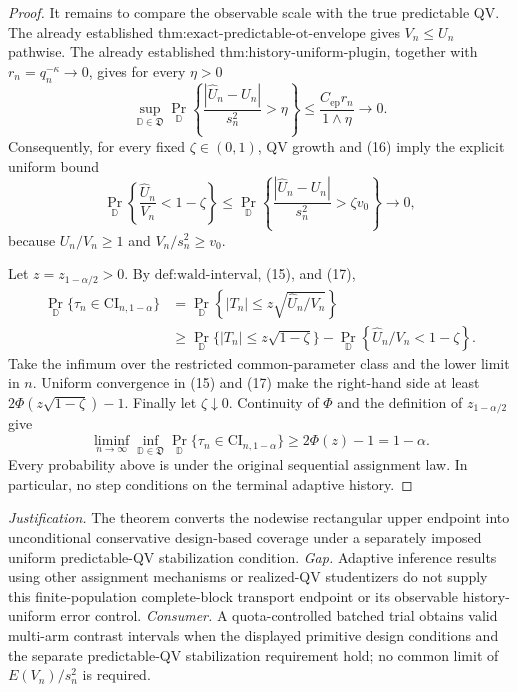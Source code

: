 \documentclass{article}
\begin{document}
\begin{proof}
It remains to compare the observable scale with the true predictable QV.  The already established \(\text{thm:exact-predictable-ot-envelope}\) gives \(V_n\le U_n\) pathwise.  The already established \(\text{thm:history-uniform-plugin}\), together with \(r_n=q_n^{-\kappa}\to0\), gives for every \(\eta>0\)
\[
\sup_{\mathbb D\in\mathfrak D}
\Pr_{\mathbb D}\!\left\{\frac{|\widehat U_n-U_n|}{s_n^2}>\eta\right\}
\le\frac{C_{\mathrm{ep}}r_n}{1\wedge\eta}\longrightarrow0.
\tag{16}
\]
Consequently, for every fixed \(\zeta\in(0,1)\), QV growth and (16) imply the explicit uniform bound
\[
\Pr_{\mathbb D}\!\left\{\frac{\widehat U_n}{V_n}<1-\zeta\right\}
\le
\Pr_{\mathbb D}\!\left\{\frac{|\widehat U_n-U_n|}{s_n^2}>\zeta v_0\right\}
\longrightarrow0,
\tag{17}
\]
because \(U_n/V_n\ge1\) and \(V_n/s_n^2\ge v_0\).

Let \(z=z_{1-\alpha/2}>0\).  By \(\text{def:wald-interval}\), (15), and (17),
\[
\begin{aligned}
\Pr_{\mathbb D}\{\tau_n\in\mathrm{CI}_{n,1-\alpha}\}
&=\Pr_{\mathbb D}\!\left\{|T_n|\le z\sqrt{\widehat U_n/V_n}\right\}\\
&\ge \Pr_{\mathbb D}\{|T_n|\le z\sqrt{1-\zeta}\}
-\Pr_{\mathbb D}\!\left\{\widehat U_n/V_n<1-\zeta\right\}.
\end{aligned}
\tag{18}
\]
Take the infimum over the restricted common-parameter class and the lower limit in \(n\).  Uniform convergence in (15) and (17) make the right-hand side at least
\(2\Phi(z\sqrt{1-\zeta})-1\).  Finally let \(\zeta\downarrow0\).  Continuity of \(\Phi\) and the definition of \(z_{1-\alpha/2}\) give
\[
\liminf_{n\to\infty}\inf_{\mathbb D\in\mathfrak D}
\Pr_{\mathbb D}\{\tau_n\in\mathrm{CI}_{n,1-\alpha}\}
\ge2\Phi(z)-1=1-\alpha.
\tag{19}
\]
Every probability above is under the original sequential assignment law.  In particular, no step conditions on the terminal adaptive history.
\end{proof}
\par\smallskip\noindent \textit{Justification.} The theorem converts the nodewise rectangular upper endpoint into unconditional conservative design-based coverage under a separately imposed uniform predictable-QV stabilization condition. \textit{Gap.} Adaptive inference results using other assignment mechanisms or realized-QV studentizers do not supply this finite-population complete-block transport endpoint or its observable history-uniform error control. \textit{Consumer.} A quota-controlled batched trial obtains valid multi-arm contrast intervals when the displayed primitive design conditions and the separate predictable-QV stabilization requirement hold; no common limit of \(E(V_n)/s_n^2\) is required.
\end{document}

